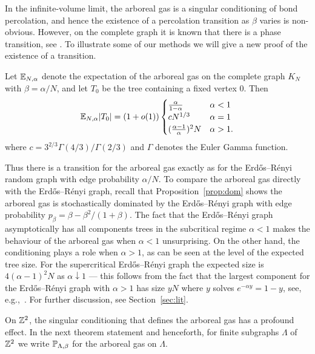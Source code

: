 \documentclass[11pt]{amsart}
\numberwithin{equation}{section}
\numberwithin{theorem}{section}
\begin{document}
In the infinite-volume
limit, the arboreal gas is a singular conditioning of bond
percolation, and hence the existence of a percolation transition as
$\beta$ varies is non-obvious. However, on the complete graph it is
known that there is a phase transition, see
\cite{MR1167294,MR3845513,MR2567041}. To illustrate some of our methods we will
give a new proof of the existence of a transition.

\begin{proposition} \label{thm:MFT0}
  Let $\E_{N,\alpha}$ 
  denote the expectation of the arboreal
  gas on the complete graph $K_{N}$ with $\beta = \alpha /N$, and let
  $T_{0}$ be the tree containing a fixed vertex $0$.  Then
  \begin{equation}
    \label{eq:MFT0}
    \E_{N,\alpha} 
    \abs{T_{0}} = (1+o(1))
    \begin{cases}
      \frac{\alpha}{1-\alpha} & \alpha<1 \\
      c N^{1/3} & \alpha = 1 \\
      (\frac{\alpha-1}{\alpha})^2 N & \alpha>1.
    \end{cases}
  \end{equation}
  where $c=3^{2/3}\Gamma(4/3)/\Gamma(2/3)$ and $\Gamma$ denotes the Euler Gamma function.
\end{proposition}
Thus there is a transition for the arboreal gas exactly as for the
Erd\H{o}s--R\'{e}nyi random graph with edge probability $\alpha/N$. To
compare the arboreal gas directly with the Erd\H{o}s--R\'{e}nyi
graph, recall that Proposition~\ref{prop:dom} shows the arboreal gas is
stochastically dominated by the Erd\H{o}s--R\'{e}nyi graph with edge
probability
$p_{\beta} = \beta - \beta^{2}/(1+\beta)$. The fact that the
Erd\H{o}s--R\'{e}nyi graph asymptotically has all components trees in
the subcritical regime $\alpha<1$ makes the behaviour of the arboreal gas
when $\alpha<1$ unsurprising. On the other hand, the conditioning plays a role when
$\alpha>1$, as can be seen at the level of the expected tree size.
For the supercritical Erd\H{o}s--R\'{e}nyi graph the expected size is
$4(\alpha-1)^{2}N$ as $\alpha\downarrow 1$ ---  this follows from the fact
that the largest component for the Erd\H{o}s--R\'{e}nyi graph with
$\alpha>1$ has size $yN$ where $y$ solves $e^{-\alpha y}=1-y$, see,
e.g.,~\cite{MR3524748}. For further discussion, see
Section~\ref{sec:lit}.

On $\Z^2$, the singular conditioning that defines the arboreal gas has
a profound effect. In the next theorem statement and henceforth, for
finite subgraphs $\Lambda$ of $\Z^{2}$ we write $\P_{\Lambda,\beta}$
for the arboreal gas on $\Lambda$.
\end{document}
